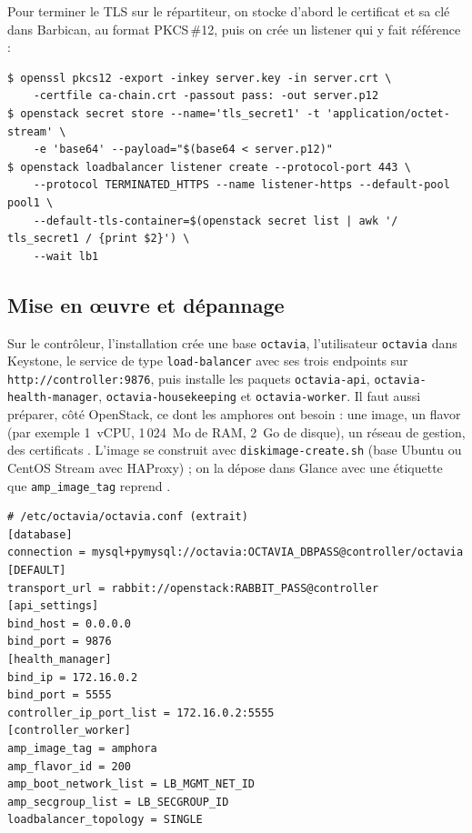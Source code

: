 Pour terminer le TLS sur le répartiteur, on stocke d'abord le certificat et sa clé dans Barbican, au format PKCS\,\#12,
puis on crée un listener qui y fait référence \parencite{octavia-cookbook} :

\par\noindent\begin{minipage}{\linewidth}
\begin{lstlisting}[style=terminal]
$ openssl pkcs12 -export -inkey server.key -in server.crt \
    -certfile ca-chain.crt -passout pass: -out server.p12
$ openstack secret store --name='tls_secret1' -t 'application/octet-stream' \
    -e 'base64' --payload="$(base64 < server.p12)"
$ openstack loadbalancer listener create --protocol-port 443 \
    --protocol TERMINATED_HTTPS --name listener-https --default-pool pool1 \
    --default-tls-container=$(openstack secret list | awk '/ tls_secret1 / {print $2}') \
    --wait lb1
\end{lstlisting}
\end{minipage}\par

\subsection{Mise en œuvre et dépannage}\label{sec:oc-deploiement}

Sur le contrôleur, l'installation crée une base \texttt{octavia}, l'utilisateur \texttt{octavia} dans Keystone, le service de
type \texttt{load-balancer} avec ses trois endpoints sur \texttt{http://controller:9876}, puis installe les paquets
\texttt{octavia-api}, \texttt{octavia-health-manager}, \texttt{octavia-housekeeping} et \texttt{octavia-worker}. Il faut aussi
préparer, côté OpenStack, ce dont les amphores ont besoin : une image, un flavor (par exemple 1~vCPU, 1\,024~Mo de RAM, 2~Go de
disque), un réseau de gestion, des certificats \parencite{octavia-install}. L'image se construit avec
\texttt{diskimage-create.sh} (base Ubuntu ou CentOS Stream avec HAProxy) \parencite{octavia-amphora-image} ; on la dépose dans
Glance avec une étiquette que \texttt{amp\_\allowbreak image\_\allowbreak tag} reprend \parencite{octavia-maintenance}.

\par\noindent\begin{minipage}{\linewidth}
\begin{lstlisting}
# /etc/octavia/octavia.conf (extrait)
[database]
connection = mysql+pymysql://octavia:OCTAVIA_DBPASS@controller/octavia
[DEFAULT]
transport_url = rabbit://openstack:RABBIT_PASS@controller
[api_settings]
bind_host = 0.0.0.0
bind_port = 9876
[health_manager]
bind_ip = 172.16.0.2
bind_port = 5555
controller_ip_port_list = 172.16.0.2:5555
[controller_worker]
amp_image_tag = amphora
amp_flavor_id = 200
amp_boot_network_list = LB_MGMT_NET_ID
amp_secgroup_list = LB_SECGROUP_ID
loadbalancer_topology = SINGLE
\end{lstlisting}
\end{minipage}\par

